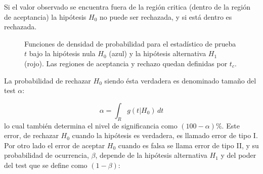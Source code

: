 Si el valor observado se encuentra fuera de la región critica (dentro de la
región de aceptancia) la hipótesis $H_0$ no puede ser rechazada, y si está
dentro es rechazada.

\begin{figure}[h]
  \centering
  
  \caption{Funciones de densidad de probabilidad para el estadístico de prueba
    $t$ bajo la hipótesis nula $H_0$ (azul) y la hipótesis alternativa $H_1$
    (rojo). Las regiones de aceptancia y rechazo quedan definidas por $t_c$.}
  \label{fig:stat_test}
\end{figure}





La probabilidad de rechazar $H_0$ siendo ésta verdadera es denominado tamaño del test $\alpha$:

\begin{equation}
  \alpha = \int_{R} g(t|H_0)\, dt
\end{equation}
%
lo cual también determina el nivel de significancia como
$(100 - \alpha) \%$. Este error, de rechazar $H_0$ cuando la hipótesis es verdadera, es llamado
error de tipo I. Por otro lado el error de aceptar $H_0$ cuando es falsa se
llama error de tipo II, y su probabilidad de ocurrencia, $\beta$, depende de la
hipótesis alternativa $H_1$ y del poder del test que se define como $(1-\beta)$:

